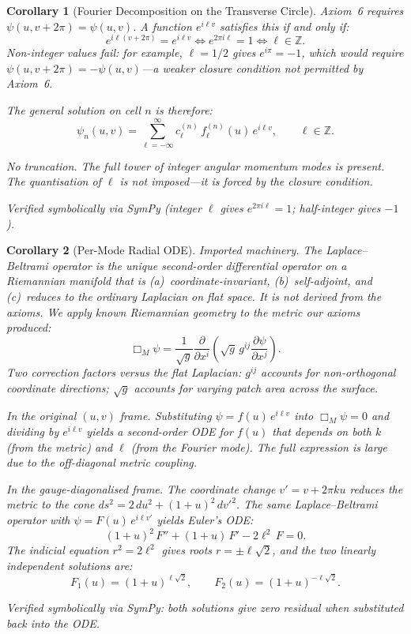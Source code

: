 \documentclass[12pt]{amsart}
\newtheorem{corollary}{Corollary}
\begin{document}
\begin{corollary}[Fourier Decomposition on the Transverse Circle]
Axiom~6 requires $\psi(u, v + 2\pi) = \psi(u,v)$. A function $e^{i\ell v}$ satisfies this
if and only if:
\[
  e^{i\ell(v + 2\pi)} = e^{i\ell v} \iff e^{2\pi i\ell} = 1 \iff \ell \in \mathbb{Z}.
\]
Non-integer values fail: for example, $\ell = 1/2$ gives $e^{i\pi} = -1$, which would
require $\psi(u, v + 2\pi) = -\psi(u,v)$---a weaker closure condition not permitted by
Axiom~6.

The general solution on cell $n$ is therefore:
\[
  \psi_n(u,v) = \sum_{\ell=-\infty}^{\infty} c_\ell^{(n)}\, f_\ell^{(n)}(u)\, e^{i\ell v},
  \qquad \ell \in \mathbb{Z}.
\]

No truncation. The full tower of integer angular momentum modes is present. The quantisation
of $\ell$ is not imposed---it is forced by the closure condition.

Verified symbolically via SymPy (integer $\ell$ gives $e^{2\pi i\ell} = 1$; half-integer
gives $-1$).
\end{corollary}

\begin{corollary}[Per-Mode Radial ODE]
\textit{Imported machinery.} The Laplace--Beltrami operator is the unique second-order
differential operator on a Riemannian manifold that is (a)~coordinate-invariant, (b)~self-adjoint,
and (c)~reduces to the ordinary Laplacian on flat space. It is not derived from the axioms. We
apply known Riemannian geometry to the metric our axioms produced:
\[
  \Box_M \psi = \frac{1}{\sqrt{g}} \frac{\partial}{\partial x^i}
    \left(\sqrt{g}\, g^{ij} \frac{\partial\psi}{\partial x^j}\right).
\]
Two correction factors versus the flat Laplacian: $g^{ij}$ accounts for non-orthogonal
coordinate directions; $\sqrt{g}$ accounts for varying patch area across the surface.

\textit{In the original $(u,v)$ frame.} Substituting $\psi = f(u)\, e^{i\ell v}$ into
$\Box_M \psi = 0$ and dividing by $e^{i\ell v}$ yields a second-order ODE for $f(u)$ that
depends on both $k$ (from the metric) and $\ell$ (from the Fourier mode). The full expression
is large due to the off-diagonal metric coupling.

\textit{In the gauge-diagonalised frame.} The coordinate change $v' = v + 2\pi k u$ reduces
the metric to the cone $ds^2 = 2\, du^2 + (1+u)^2\, dv'^2$. The same Laplace--Beltrami
operator with $\psi = F(u)\, e^{i\ell v'}$ yields Euler's ODE:
\[
  (1+u)^2\, F'' + (1+u)\, F' - 2\ell^2\, F = 0.
\]
The indicial equation $r^2 = 2\ell^2$ gives roots $r = \pm\ell\sqrt{2}$, and the two linearly
independent solutions are:
\[
  F_1(u) = (1+u)^{\ell\sqrt{2}}, \qquad F_2(u) = (1+u)^{-\ell\sqrt{2}}.
\]

Verified symbolically via SymPy: both solutions give zero residual when substituted back
into the ODE.
\end{corollary}
\end{document}
